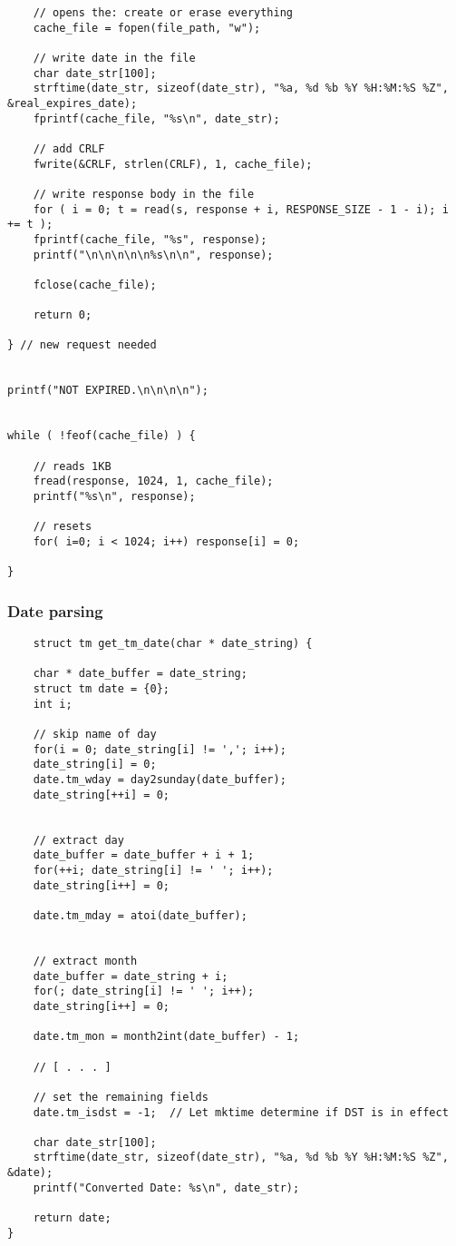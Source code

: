 \begin{lstlisting}
    // opens the: create or erase everything
    cache_file = fopen(file_path, "w");

    // write date in the file
    char date_str[100];
    strftime(date_str, sizeof(date_str), "%a, %d %b %Y %H:%M:%S %Z", &real_expires_date);
    fprintf(cache_file, "%s\n", date_str);
    
    // add CRLF
    fwrite(&CRLF, strlen(CRLF), 1, cache_file);

    // write response body in the file
    for ( i = 0; t = read(s, response + i, RESPONSE_SIZE - 1 - i); i += t );
    fprintf(cache_file, "%s", response);
    printf("\n\n\n\n\n%s\n\n", response);

    fclose(cache_file);

    return 0;

} // new request needed


printf("NOT EXPIRED.\n\n\n\n");


while ( !feof(cache_file) ) {
    
    // reads 1KB
    fread(response, 1024, 1, cache_file);
    printf("%s\n", response);
    
    // resets
    for( i=0; i < 1024; i++) response[i] = 0;

}

\end{lstlisting}

\subsubsection{Date parsing}

\begin{lstlisting}
    struct tm get_tm_date(char * date_string) {

    char * date_buffer = date_string;
    struct tm date = {0};
    int i;

    // skip name of day
    for(i = 0; date_string[i] != ','; i++);
    date_string[i] = 0;
    date.tm_wday = day2sunday(date_buffer);
    date_string[++i] = 0;


    // extract day
    date_buffer = date_buffer + i + 1;
    for(++i; date_string[i] != ' '; i++);
    date_string[i++] = 0;

    date.tm_mday = atoi(date_buffer);


    // extract month
    date_buffer = date_string + i;
    for(; date_string[i] != ' '; i++);
    date_string[i++] = 0;

    date.tm_mon = month2int(date_buffer) - 1;

    // [ . . . ]

    // set the remaining fields
    date.tm_isdst = -1;  // Let mktime determine if DST is in effect

    char date_str[100];
    strftime(date_str, sizeof(date_str), "%a, %d %b %Y %H:%M:%S %Z", &date);
    printf("Converted Date: %s\n", date_str);

    return date;
}
\end{lstlisting}
